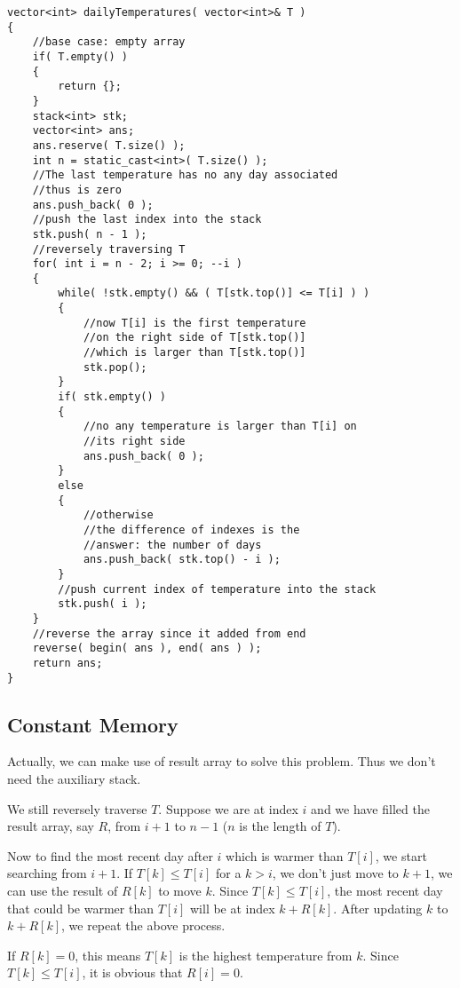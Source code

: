\setcounter{lstlisting}{0}
\begin{lstlisting}[style=customc, caption={Stack}]
vector<int> dailyTemperatures( vector<int>& T )
{
    //base case: empty array
    if( T.empty() )
    {
        return {};
    }
    stack<int> stk;
    vector<int> ans;
    ans.reserve( T.size() );
    int n = static_cast<int>( T.size() );
    //The last temperature has no any day associated
    //thus is zero
    ans.push_back( 0 );
    //push the last index into the stack
    stk.push( n - 1 );
    //reversely traversing T
    for( int i = n - 2; i >= 0; --i )
    {
        while( !stk.empty() && ( T[stk.top()] <= T[i] ) )
        {
            //now T[i] is the first temperature
            //on the right side of T[stk.top()]
            //which is larger than T[stk.top()]
            stk.pop();
        }
        if( stk.empty() )
        {
            //no any temperature is larger than T[i] on
            //its right side
            ans.push_back( 0 );
        }
        else
        {
            //otherwise
            //the difference of indexes is the
            //answer: the number of days
            ans.push_back( stk.top() - i );
        }
        //push current index of temperature into the stack
        stk.push( i );
    }
    //reverse the array since it added from end
    reverse( begin( ans ), end( ans ) );
    return ans;
}
\end{lstlisting}

\subsection{Constant Memory}
Actually, we can make use of result array to solve this problem. Thus we don't need the auxiliary stack. 

We still reversely traverse $T$. Suppose we are at index $i$ and we have filled the result array, say $R$, from $i+1$ to $n-1$ ($n$ is the length of $T$). 

Now to find the most recent day after $i$ which is warmer than $T[i]$, we start searching from $i+1$. If $T[k] \leq T[i]$ for a $k >i$, we don't just move to $k+1$, we can use the result of $R[k]$ to move $k$. Since $T[k]\leq T[i]$, the most recent day that could be warmer than $T[i]$ will be at index $k+R[k]$. After updating $k$ to $k+R[k]$, we repeat the above process. 

If $R[k]=0$, this means $T[k]$ is the highest temperature from $k$. Since $T[k]\leq T[i]$, it is obvious that $R[i]=0$.

